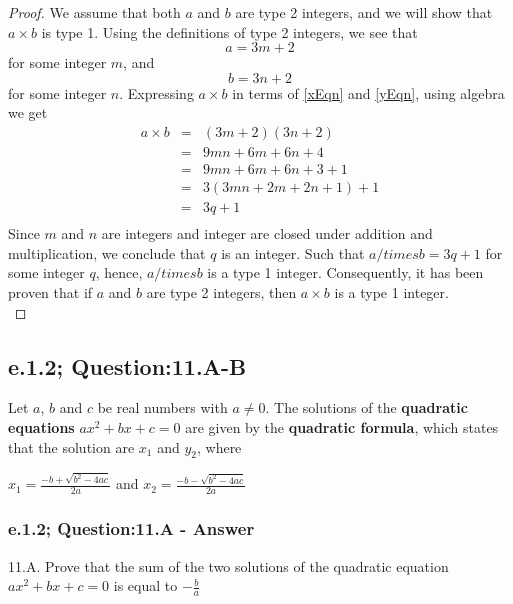 \begin{proof}
We assume that both $a$ and $b$ are type 2 integers, and we will show that $a \times b$ is type 1. Using the definitions of type 2 integers, we see that
\begin{equation}
\label{xEqn}
a = 3m + 2
\end{equation}
for some integer $m$, and
\begin{equation}
\label{yEqn}
b = 3n + 2
\end{equation}
for some integer $n$. Expressing $a \times b$ in terms of \ref{xEqn} and \ref{yEqn}, using algebra we get
\begin{eqnarray*}
a \times b & = & (3m + 2)(3n + 2)  \nonumber \\
& = & 9mn + 6m + 6n + 4 \nonumber \\
& = & 9mn + 6m + 6n + 3 + 1 \nonumber \\
& = & 3(3mn + 2m + 2n + 1) + 1 \nonumber \\
& = & 3q + 1 \nonumber \\
\end{eqnarray*}
Since $m$ and $n$ are integers and integer are closed under addition and multiplication, we conclude that $q$ is an integer. Such that $a /times b = 3q + 1$ for some integer $q$, hence, $a /times b$ is a type 1 integer. Consequently, it has been proven that if $a$ and $b$ are type 2 integers, then $a \times b$ is a type 1 integer. \\
\end{proof}




\subsection{e.1.2; Question:11.A-B}
Let $a$, $b$ and $c$ be real numbers with $a \neq 0$. The solutions of the {\bf quadratic equations} $ax^2 + bx + c = 0$ are given by the {\bf quadratic formula}, which states that the solution are $x_1$ and $y_2$, where \\

\begin{center}

$x_1 = \frac{-b + \sqrt{b^2 -4ac}}{2a}$ and $x_2 = \frac{-b - \sqrt{b^2 -4ac}}{2a}$
\end{center}

\subsubsection*{e.1.2; Question:11.A - Answer}
11.A. Prove that the sum of the two solutions of the quadratic equation $ax^2 + bx + c = 0$ is equal to $ -\frac{b}{a}$ \\

